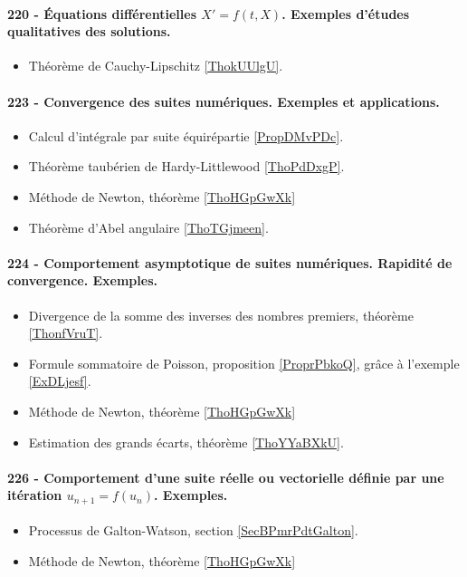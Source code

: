 \paragraph{220 - Équations différentielles $X' = f (t , X )$. Exemples d’études qualitatives des solutions.}
\begin{itemize}
    \item Théorème de Cauchy-Lipschitz \ref{ThokUUlgU}.
\end{itemize}
\paragraph{223 - Convergence des suites numériques. Exemples et applications.}
\begin{itemize}
    \item Calcul d'intégrale par suite équirépartie \ref{PropDMvPDc}.
    \item Théorème taubérien de Hardy-Littlewood \ref{ThoPdDxgP}.
    \item Méthode de Newton, théorème \ref{ThoHGpGwXk}
    \item Théorème d'Abel angulaire \ref{ThoTGjmeen}.
\end{itemize}
\paragraph{224 - Comportement asymptotique de suites numériques. Rapidité de convergence. Exemples.}
\begin{itemize}
    \item Divergence de la somme des inverses des nombres premiers, théorème \ref{ThonfVruT}.
    \item Formule sommatoire de Poisson, proposition \ref{ProprPbkoQ}, grâce à l'exemple \ref{ExDLjesf}.
    \item Méthode de Newton, théorème \ref{ThoHGpGwXk}
    \item Estimation des grands écarts, théorème \ref{ThoYYaBXkU}.
\end{itemize}
\paragraph{226 - Comportement d’une suite réelle ou vectorielle définie par une itération \( u_{n+1}=f(u_n)\). Exemples.}
\begin{itemize}
    \item Processus de Galton-Watson, section \ref{SecBPmrPdtGalton}.
    \item Méthode de Newton, théorème \ref{ThoHGpGwXk}
\end{itemize}
